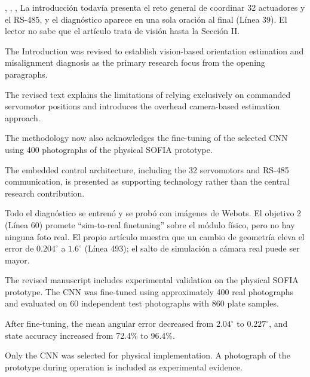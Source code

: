 \documentclass{LabDSTresponse}
\begin{document}
	{,
		,
		,
		}
	{La introducción todavía presenta el reto
		general de coordinar 32 actuadores y el
		RS-485, y el diagnóstico aparece en una
		sola oración al final (Línea 39).
		El lector no sabe que el artículo trata
		de visión hasta la Sección II.}
	{
		The Introduction was revised to establish
		vision-based orientation estimation and
		misalignment diagnosis as the primary
		research focus from the opening paragraphs.
		
		The revised text explains the limitations
		of relying exclusively on commanded
		servomotor positions and introduces the
		overhead camera-based estimation approach.
		
		The methodology now also acknowledges
		the fine-tuning of the selected CNN
		using 400 photographs of the physical
		SOFIA prototype.
		
		The embedded control architecture,
		including the 32 servomotors and RS-485
		communication, is presented as supporting
		technology rather than the central
		research contribution.
	}
	
	
	{Todo el diagnóstico se entrenó y se probó
		con imágenes de Webots. El objetivo 2
		(Línea 60) promete ``sim-to-real finetuning''
		sobre el módulo físico, pero no hay ninguna
		foto real. El propio artículo muestra que
		un cambio de geometría eleva el error de
		$0.204^\circ$ a $1.6^\circ$ (Línea 493);
		el salto de simulación a cámara real
		puede ser mayor.}
	{The revised manuscript includes experimental
		validation on the physical SOFIA prototype. The CNN was fine-tuned using approximately 400 real photographs and evaluated on 60 independent test photographs with 860 plate samples.
		
		After fine-tuning, the mean angular error decreased from $2.04^\circ$ to $0.227^\circ$, and state accuracy increased from 72.4\% to 96.4\%.
		
		Only the CNN was selected for physical implementation. A photograph of the prototype during operation is included as experimental evidence.}
	
\end{document}
